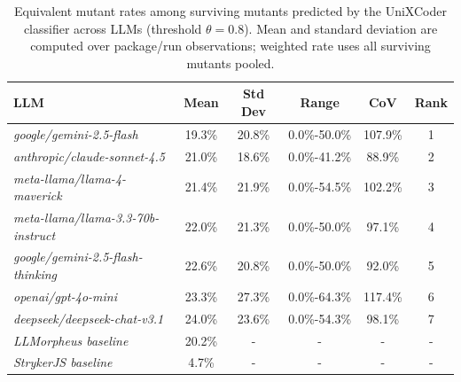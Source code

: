 \begin{table}
\centering
{\scriptsize
\begin{tabular}{l||c|c|c|c||c}
\textbf{LLM} & \textbf{Mean} & \textbf{Std Dev} & \textbf{Range} & \textbf{CoV} & \textbf{Rank} \\
\hline\hline
\textit{google/gemini-2.5-flash} & 19.3\% & 20.8\% & 0.0\%-50.0\% & 107.9\% & 1 \\
\textit{anthropic/claude-sonnet-4.5} & 21.0\% & 18.6\% & 0.0\%-41.2\% & 88.9\% & 2 \\
\textit{meta-llama/llama-4-maverick} & 21.4\% & 21.9\% & 0.0\%-54.5\% & 102.2\% & 3 \\
\textit{meta-llama/llama-3.3-70b-instruct} & 22.0\% & 21.3\% & 0.0\%-50.0\% & 97.1\% & 4 \\
\textit{google/gemini-2.5-flash-thinking} & 22.6\% & 20.8\% & 0.0\%-50.0\% & 92.0\% & 5 \\
\textit{openai/gpt-4o-mini} & 23.3\% & 27.3\% & 0.0\%-64.3\% & 117.4\% & 6 \\
\textit{deepseek/deepseek-chat-v3.1} & 24.0\% & 23.6\% & 0.0\%-54.3\% & 98.1\% & 7 \\
\hline
\textit{LLMorpheus baseline} & 20.2\% & - & - & - & - \\
\textit{StrykerJS baseline} & 4.7\% & - & - & - & - \\
\end{tabular}
}
\caption{Equivalent mutant rates among surviving mutants predicted by the UniXCoder classifier across LLMs (threshold $\theta=0.8$). Mean and standard deviation are computed over package/run observations; weighted rate uses all surviving mutants pooled.}
\label{tab:llm-equiv-main}
\end{table}